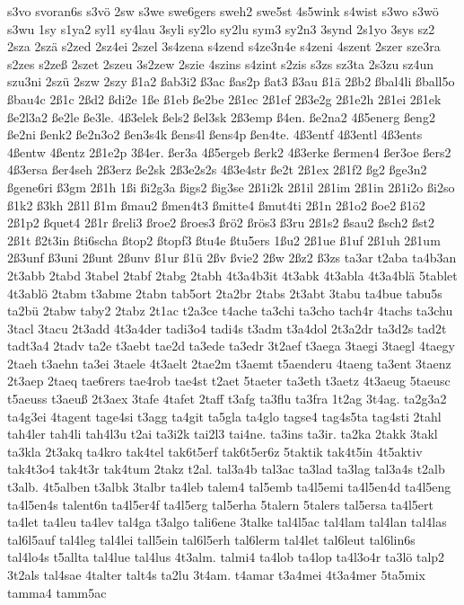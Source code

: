 {s3vo
svoran6s
s3vö
2sw
s3we
swe6gers
sweh2
swe5st
4s5wink
s4wist
s3wo
s3wö
s3wu
1sy
s1ya2
syl1
sy4lau
3syli
sy2lo
sy2lu
sym3
sy2n3
3synd
2s1yo
3sys
sz2
2sza
2szä
s2zed
2sz4ei
2szel
3s4zena
s4zend
s4ze3n4e
s4zeni
4szent
2szer
sze3ra
s2zes
s2zeß
2szet
2szeu
3s2zew
2szie
4szins
s4zint
s2zis
s3zs
sz3ta
2s3zu
sz4un
szu3ni
2szü
2szw
2szy
ß1a2
ßab3i2
ß3ac
ßas2p
ßat3
ß3au
ß1ä
2ßb2
ßbal4li
ßball5o
ßbau4c
2ß1c
2ßd2
ßdi2e
1ße
ß1eb
ße2be
2ß1ec
2ß1ef
2ß3e2g
2ß1e2h
2ß1ei
2ß1ek
ße2l3a2
ße2le
ße3le.
4ß3elek
ßels2
ßel3sk
2ß3emp
ß4en.
ße2na2
4ß5energ
ßeng2
ße2ni
ßenk2
ße2n3o2
ßen3s4k
ßens4l
ßens4p
ßen4te.
4ß3entf
4ß3entl
4ß3ents
4ßentw
4ßentz
2ß1e2p
3ß4er.
ßer3a
4ß5ergeb
ßerk2
4ß3erke
ßermen4
ßer3oe
ßers2
4ß3ersa
ßer4seh
2ß3erz
ße2sk
2ß3e2s2s
4ß3e4str
ße2t
2ß1ex
2ß1f2
ßg2
ßge3n2
ßgene6ri
ß3gm
2ß1h
1ßi
ßi2g3a
ßigs2
ßig3se
2ß1i2k
2ß1il
2ß1im
2ß1in
2ß1i2o
ßi2so
ß1k2
ß3kh
2ß1l
ß1m
ßmau2
ßmen4t3
ßmitte4
ßmut4ti
2ß1n
2ß1o2
ßoe2
ß1ö2
2ß1p2
ßquet4
2ß1r
ßreli3
ßroe2
ßroes3
ßrö2
ßrös3
ß3ru
2ß1s2
ßsau2
ßsch2
ßst2
2ß1t
ß2t3in
ßti6scha
ßtop2
ßtopf3
ßtu4e
ßtu5ers
1ßu2
2ß1ue
ß1uf
2ß1uh
2ß1um
2ß3unf
ß3uni
2ßunt
2ßunv
ß1ur
ß1ü
2ßv
ßvie2
2ßw
2ßz2
ß3zs
ta3ar
t2aba
ta4b3an
2t3abb
2tabd
3tabel
2tabf
2tabg
2tabh
4t3a4b3it
4t3abk
4t3abla
4t3a4blä
5tablet
4t3ablö
2tabm
t3abme
2tabn
tab5ort
2ta2br
2tabs
2t3abt
3tabu
ta4bue
tabu5s
ta2bü
2tabw
taby2
2tabz
2t1ac
t2a3ce
t4ache
ta3chi
ta3cho
tach4r
4tachs
ta3chu
3tacl
3tacu
2t3add
4t3a4der
tadi3o4
tadi4s
t3adm
t3a4dol
2t3a2dr
ta3d2s
tad2t
tadt3a4
2tadv
ta2e
t3aebt
tae2d
ta3ede
ta3edr
3t2aef
t3aega
3taegi
3taegl
4taegy
2taeh
t3aehn
ta3ei
3taele
4t3aelt
2tae2m
t3aemt
t5aenderu
4taeng
ta3ent
3taenz
2t3aep
2taeq
tae6rers
tae4rob
tae4st
t2aet
5taeter
ta3eth
t3aetz
4t3aeug
5taeusc
t5aeuss
t3aeuß
2t3aex
3tafe
4tafet
2taff
t3afg
ta3flu
ta3fra
1t2ag
3t4ag.
ta2g3a2
ta4g3ei
4tagent
tage4si
t3agg
ta4git
ta5gla
ta4glo
tagse4
tag4s5ta
tag4sti
2tahl
tah4ler
tah4li
tah4l3u
t2ai
ta3i2k
tai2l3
tai4ne.
ta3ins
ta3ir.
ta2ka
2takk
3takl
ta3kla
2t3akq
ta4kro
tak4tel
tak6t5erf
tak6t5er6z
5taktik
tak4t5in
4t5aktiv
tak4t3o4
tak4t3r
tak4tum
2takz
t2al.
tal3a4b
tal3ac
ta3lad
ta3lag
tal3a4s
t2alb
t3alb.
4t5alben
t3albk
3talbr
ta4leb
talem4
tal5emb
ta4l5emi
ta4l5en4d
ta4l5eng
ta4l5en4s
talent6n
ta4l5er4f
ta4l5erg
tal5erha
5talern
5talers
tal5ersa
ta4l5ert
ta4let
ta4leu
ta4lev
tal4ga
t3algo
tali6ene
3talke
tal4l5ac
tal4lam
tal4lan
tal4las
tal6l5auf
tal4leg
tal4lei
tall5ein
tal6l5erh
tal6lerm
tal4let
tal6leut
tal6lin6s
tal4lo4s
t5allta
tal4lue
tal4lus
4t3alm.
talmi4
ta4lob
ta4lop
ta4l3o4r
ta3lö
talp2
3t2als
tal4sae
4talter
talt4s
ta2lu
3t4am.
t4amar
t3a4mei
4t3a4mer
5ta5mix
tamma4
tamm5ac
}

